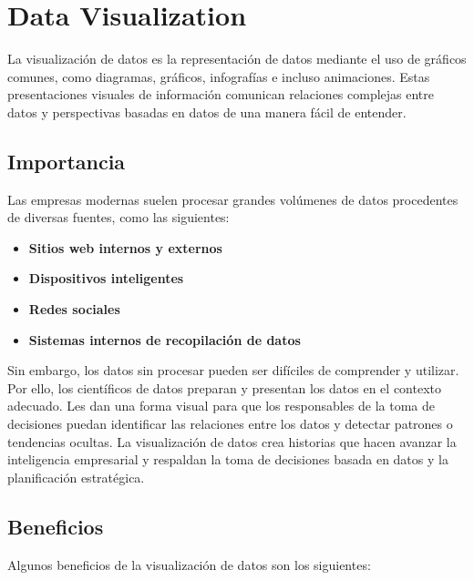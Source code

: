 \section{Data Visualization}
La visualización de datos es la representación de datos mediante el
uso de gráficos comunes, como diagramas, gráficos, infografías e 
incluso animaciones. Estas presentaciones visuales de información
comunican relaciones complejas entre datos y perspectivas basadas
en datos de una manera fácil de entender. \cite{ibm-data-visualization}


\subsection{Importancia}
Las empresas modernas suelen procesar grandes volúmenes de datos
procedentes de diversas fuentes, como las siguientes:

\begin{itemize}
  \item {\textbf{Sitios web internos y externos}}
  \item {\textbf{Dispositivos inteligentes}}
  \item {\textbf{Redes sociales}}
  \item {\textbf{Sistemas internos de recopilación de datos}}
\end{itemize}

Sin embargo, los datos sin procesar pueden ser difíciles de
comprender y utilizar. Por ello, los científicos de datos preparan
y presentan los datos en el contexto adecuado. Les dan una forma
visual para que los responsables de la toma de decisiones puedan
identificar las relaciones entre los datos y detectar patrones o
tendencias ocultas. La visualización de datos crea historias que
hacen avanzar la inteligencia empresarial y respaldan la toma de
decisiones basada en datos y la planificación estratégica.

\subsection{Beneficios}
Algunos beneficios de la visualización de datos son los siguientes:

